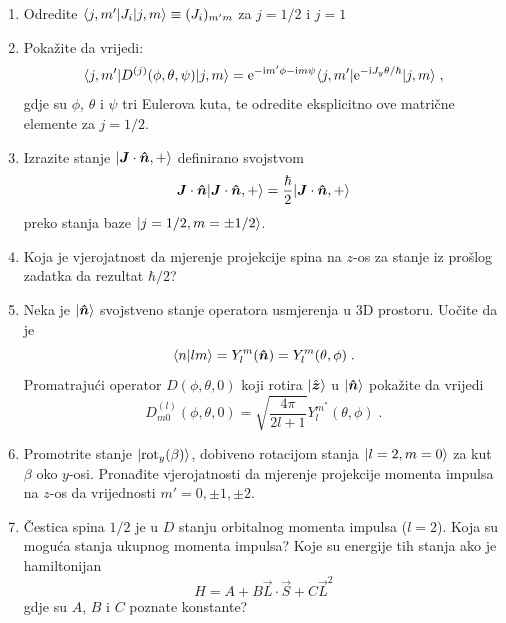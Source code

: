 \begin{enumerate}[label=\arabic{chapter}.\arabic*.]

    \item \label{zad:matj}
Odredite $\langle j, m' |J_{i} | j, m \rangle \equiv (J_i)_{m' m}$ za 
$j=1/2$ i $j=1$

\item
Pokažite da vrijedi: 
\begin{equation}
\langle j, m' | D^{(j)}(\phi, \theta, \psi) | j, m \rangle = \textrm{e}^{-\textrm{i} m'\phi-\textrm{i} m\psi}
\langle j, m' | \textrm{e}^{-\textrm{i} J_y \theta /\hbar} | j, m \rangle \;,
\end{equation}
gdje su $\phi$, $\theta$ i $\psi$ tri Eulerova kuta,
te odredite eksplicitno ove matrične elemente za $j=1/2$.

\item
Izrazite stanje $\ket{\vec{J}\cdot\unitn, +}$ definirano svojstvom
\begin{displaymath}
    \vec{J}\cdot\unitn \ket{\vec{J}\cdot\unitn, +} =
  \frac{\hbar}{2} \ket{\vec{J}\cdot\unitn, +}
\end{displaymath}
preko stanja baze $| j=1/2, m=\pm 1/2 \rangle$.

\item
Koja je vjerojatnost da mjerenje projekcije spina na $z$-os za stanje iz
prošlog zadatka da rezultat $\hbar/2$?

\item 
Neka je $\ket{\unitn}$ svojstveno stanje operatora usmjerenja u 3D
prostoru. Uočite da je
\begin{displaymath}
     \bra{n}lm\rangle = Y^{m}_l (\unitn) = Y^{m}_l (\theta, \phi) \;.
\end{displaymath}
Promatrajući operator $D(\phi,\theta,0)$ koji rotira $\ket{\hat{\vec{z}}}$
u $\ket{\unitn}$ pokažite da vrijedi
\begin{displaymath}
    D^{(l)}_{m0}(\phi,\theta,0)=\sqrt{\frac{4\pi}{2l+1}}
 Y^{m^*}_l (\theta, \phi)\;.
\end{displaymath}

\item
Promotrite stanje $| \text{rot}_y(\beta) \rangle$, dobiveno rotacijom stanja
$| l=2, m=0 \rangle$ za kut $\beta$ oko $y$-osi. Pronađite vjerojatnosti da
mjerenje projekcije momenta impulsa na $z$-os da vrijednosti
$m'=0,\pm 1, \pm 2$.

\item Čestica spina $1/2$ je u $D$ stanju orbitalnog momenta impulsa
($l=2$). Koja su moguća stanja ukupnog momenta impulsa? Koje su energije
tih stanja ako je hamiltonijan 
\[ H = A + B \vec{L}\cdot\vec{S} + C \vec{L}^2 \]
gdje su $A$, $B$ i $C$ poznate konstante?


\end{enumerate}
